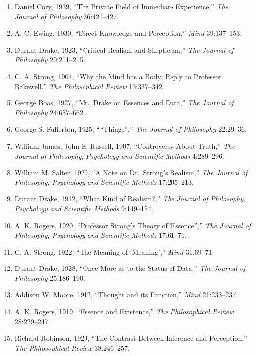 \documentclass[
]{article}
\begin{document}
\begin{enumerate}
\def\labelenumi{\arabic{enumi}.}
\item
  Daniel Cory, 1939, ``The Private Field of Immediate Experience,''
  \emph{The Journal of Philosophy} 36:421--427.
\item
  A. C. Ewing, 1930, ``Direct Knowledge and Perception,'' \emph{Mind}
  39:137--153.
\item
  Durant Drake, 1923, ``Critical Realism and Skepticism,'' \emph{The
  Journal of Philosophy} 20:211--215.
\item
  C. A. Strong, 1904, ``Why the Mind has a Body: Reply to Professor
  Bakewell,'' \emph{The Philosophical Review} 13:337--342.
\item
  George Boas, 1927, ``Mr.~Drake on Essences and Data,'' \emph{The
  Journal of Philosophy} 24:657--662.
\item
  George S. Fullerton, 1925, ````Things'','' \emph{The Journal of
  Philosophy} 22:29--36.
\item
  William James; John E. Russell, 1907, ``Controversy About Truth,''
  \emph{The Journal of Philosophy, Psychology and Scientific Methods}
  4:289--296.
\item
  William M. Salter, 1920, ``A Note on Dr.~Strong's Realism,'' \emph{The
  Journal of Philosophy, Psychology and Scientific Methods} 17:205--213.
\item
  Durant Drake, 1912, ``What Kind of Realism?,'' \emph{The Journal of
  Philosophy, Psychology and Scientific Methods} 9:149--154.
\item
  A. K. Rogers, 1920, ``Professor Strong's Theory of''Essence'',''
  \emph{The Journal of Philosophy, Psychology and Scientific Methods}
  17:61--71.
\item
  C. A. Strong, 1922, ``The Meaning of `Meaning','' \emph{Mind}
  31:69--71.
\item
  Durant Drake, 1928, ``Once More as to the Status of Data,'' \emph{The
  Journal of Philosophy} 25:186--190.
\item
  Addison W. Moore, 1912, ``Thought and its Function,'' \emph{Mind}
  21:233--237.
\item
  A. K. Rogers, 1919, ``Essence and Existence,'' \emph{The Philosophical
  Review} 28:229--247.
\item
  Richard Robinson, 1929, ``The Contrast Between Inference and
  Perception,'' \emph{The Philosophical Review} 38:246--257.
\end{enumerate}

\newpage
\end{document}
